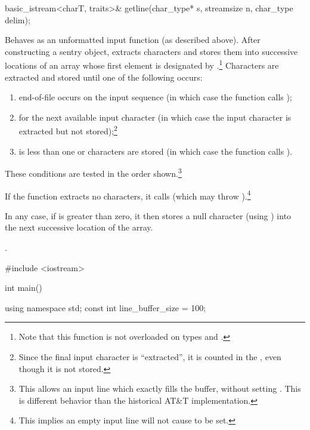 %
\begin{itemdecl}
basic_istream<charT, traits>& getline(char_type* s, streamsize n, char_type delim);
\end{itemdecl}

\begin{itemdescr}
\pnum
\effects
Behaves as an unformatted input function
(as described above).
After constructing a sentry object, extracts
characters and stores them
into successive locations of an array whose first element is designated by
.\footnote{Note that this function is not overloaded on types
and
.}
Characters are extracted and stored until one of the following occurs:
\begin{enumerate}
\item
end-of-file occurs on the input sequence
(in which case the function calls
);
\item
{}
for the next available input
character 
(in which case the input character is extracted but not stored);\footnote{Since
the final input character is ``extracted'',
it is counted in the
,
even though it is not stored.}
\item
{} is less than one or 
characters are stored
(in which case the function calls
).
\end{enumerate}

\pnum
These conditions are tested in the order shown.\footnote{This allows an input
line which exactly fills the buffer, without setting
.
This is different behavior than the historical AT\&T implementation.}

\pnum
If the function extracts no characters, it calls
(which may throw
).\footnote{This implies an
empty input line will not cause
to be set.}

\pnum
In any case, if  is greater than zero, it then stores a null character
(using
)
into the next successive location of the array.

\pnum
\returns
{}.

\pnum
\begin{example}
\begin{codeblock}
#include <iostream>

int main() {
  using namespace std;
  const int line_buffer_size = 100;

}
\end{codeblock}
\end{example}
\end{itemdescr}
